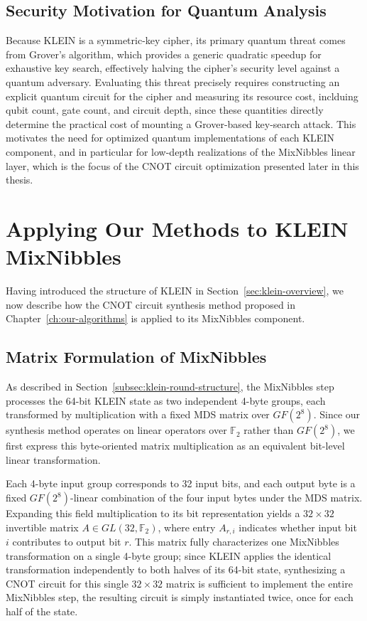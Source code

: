 \subsection{Security Motivation for Quantum Analysis}
Because KLEIN is a symmetric-key cipher, its primary quantum threat comes from Grover's algorithm\cite{grover1996fast}, which provides a generic quadratic speedup for exhaustive key search, effectively halving the cipher's security level against a quantum adversary. Evaluating this threat precisely requires constructing an explicit quantum circuit for the cipher and measuring its resource cost, inclduing qubit count, gate count, and circuit depth, since these quantities directly determine the practical cost of mounting a Grover-based key-search attack. This motivates the need for optimized quantum implementations of each KLEIN component, and in particular for low-depth realizations of the MixNibbles linear layer, which is the focus of the CNOT circuit optimization presented later in this thesis.

\section{Applying Our Methods to KLEIN MixNibbles}
Having introduced the structure of KLEIN in Section~\ref{sec:klein-overview}, we now describe how the CNOT circuit synthesis method proposed in Chapter~\ref{ch:our-algorithms} is applied to its MixNibbles component.

\subsection{Matrix Formulation of MixNibbles}
\label{subsec:mixnibbles-matrix}
As described in Section~\ref{subsec:klein-round-structure}, the MixNibbles step processes the 64-bit KLEIN state as two independent 4-byte groups, each transformed by multiplication with a fixed MDS matrix over $GF(2^{8})$. Since our synthesis method operates on linear operators over $\mathbb{F}_{2}$ rather than $GF(2^{8})$, we first express this byte-oriented matrix multiplication as an equivalent bit-level linear transformation.

Each 4-byte input group corresponds to 32 input bits, and each output byte is a fixed $GF(2^{8})$-linear combination of the four input bytes under the MDS matrix. Expanding this field multiplication to its bit representation yields a $32 \times 32$ invertible matrix $A \in GL(32, \mathbb{F}_{2})$, where entry $A_{r, i}$ indicates whether input bit $i$ contributes to output bit $r$. This matrix fully characterizes one MixNibbles transformation on a single 4-byte group; since KLEIN applies the identical transformation independently to both halves of its 64-bit state, synthesizing a CNOT circuit for this single $32 \times 32$ matrix is sufficient to implement the entire MixNibbles step, the resulting circuit is simply instantiated twice, once for each half of the state.

